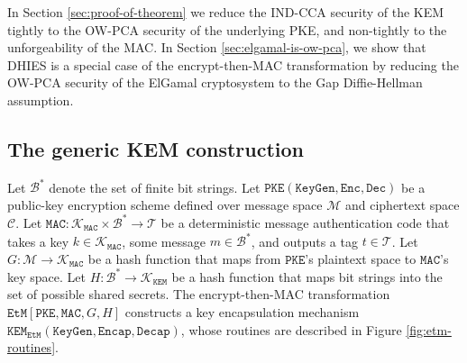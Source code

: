 \documentclass[runningheads]{llncs}
\newcommand{\pke}{\texttt{PKE}}
\newcommand{\keygen}{\texttt{KeyGen}}
\newcommand{\encrypt}{\texttt{Enc}}
\newcommand{\decrypt}{\texttt{Dec}}
\newcommand{\kem}{\texttt{KEM}}
\newcommand{\encap}{\texttt{Encap}}
\newcommand{\decap}{\texttt{Decap}}
\newcommand{\etm}{\texttt{EtM}}  %
\newcommand{\mac}{\texttt{MAC}}
\begin{document}
In Section \ref{sec:proof-of-theorem} we reduce the IND-CCA security of the KEM tightly to the OW-PCA security of the underlying PKE, and non-tightly to the unforgeability of the MAC. In Section \ref{sec:elgamal-is-ow-pca}, we show that DHIES is a special case of the encrypt-then-MAC transformation by reducing the OW-PCA security of the ElGamal cryptosystem to the Gap Diffie-Hellman assumption.

\subsection{The generic KEM construction}
Let $\mathcal{B}^\ast$ denote the set of finite bit strings. Let $\pke(\keygen, \encrypt, \decrypt)$ be a public-key encryption scheme defined over message space $\mathcal{M}$ and ciphertext space $\mathcal{C}$. Let $\mac: \mathcal{K}_\mac \times \mathcal{B}^\ast \rightarrow \mathcal{T}$ be a deterministic message authentication code that takes a key $k \in \mathcal{K}_\mac$, some message $m \in \mathcal{B}^\ast$, and outputs a tag $t \in \mathcal{T}$. Let $G: \mathcal{M} \rightarrow \mathcal{K}_\mac$ be a hash function that maps from $\pke$'s plaintext space to $\mac$'s key space. Let $H: \mathcal{B}^\ast \rightarrow \mathcal{K}_\kem$ be a hash function that maps bit strings into the set of possible shared secrets. The encrypt-then-MAC transformation $\etm[\pke, \mac, G, H]$ constructs a key encapsulation mechanism $\kem_\etm(\keygen, \encap, \decap)$, whose routines are described in Figure \ref{fig:etm-routines}.
\end{document}
